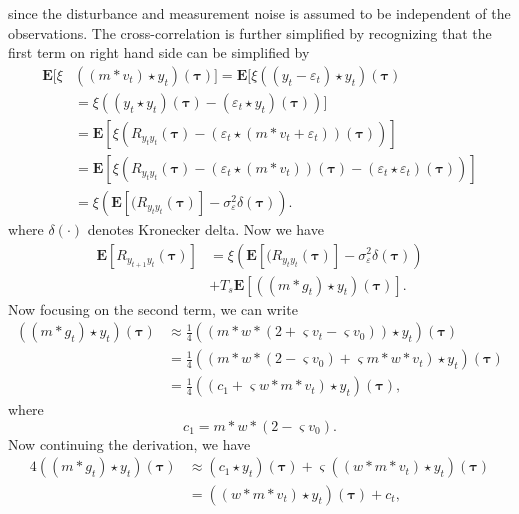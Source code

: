 \documentclass[conference,onecolumn]{IEEEtran}
\begin{document}
since the disturbance and measurement noise is assumed to be independent of the observations. 
The cross-correlation is further simplified by recognizing that the first term on right hand side can be simplified by
\begin{align}
	\mathbf{E}[\xi&\left(\left(m \ast v_t \right) \star y_t \right)(\boldsymbol{\tau})] = \mathbf{E}[\xi\left(\left(y_t-\varepsilon_t\right) \star y_t \right)(\boldsymbol{\tau}) \\
	&= \xi ((y_t \star y_t)(\boldsymbol{\tau}) - \left(\varepsilon_t\star y_t \right)(\boldsymbol{\tau}))] \\
	&= \mathbf{E}[\xi (R_{y_ty_t}(\boldsymbol{\tau})  - \left(\varepsilon_t \star (m\ast v_t + \varepsilon_t)\right) (\boldsymbol{\tau}))] \\
	&=\mathbf{E}[\xi (R_{y_ty_t}(\boldsymbol{\tau})  -\left(\varepsilon_t\star (m\ast v_t)\right)(\boldsymbol{\tau}) - (\varepsilon_t\star\varepsilon_t)(\boldsymbol{\tau}))] \\
	&= \xi\left(\mathbf{E}[ (R_{y_ty_t}(\boldsymbol{\tau})] - \sigma_{\varepsilon}^2 \delta(\boldsymbol{\tau})\right).
\end{align}
where $\delta\left(\cdot\right)$ denotes Kronecker delta. Now we have
\begin{align}
	\mathbf{E}[R_{y_{t+1}y_t}(\boldsymbol{\tau})] &= \xi\left(\mathbf{E}[ (R_{y_ty_t}(\boldsymbol{\tau})] - \sigma_{\varepsilon}^2 \delta(\boldsymbol{\tau})\right) \nonumber \\
	&+ T_s\mathbf{E}[ \left(\left(m\ast g_t\right)\star y_t \right)(\boldsymbol{\tau})].
\end{align}
Now focusing on the second term, we can write
\begin{align}
	((m \ast g_t) \star y_t)(\boldsymbol\tau) &\approx \frac{1}{4}((m \ast w \ast (2 + \varsigma v_t - \varsigma v_0))\star y_t)(\boldsymbol\tau) \\
	&= \frac{1}{4}((m\ast w \ast (2 -\varsigma v_0) + \varsigma m\ast w\ast v_t) \star y_t)(\boldsymbol\tau) \\
&= \frac{1}{4}((c_1 + \varsigma w \ast m\ast v_t) \star y_t)(\boldsymbol\tau),
\end{align}
where
\begin{equation}
	c_1 = m\ast w\ast (2 - \varsigma v_0).
\end{equation}
Now continuing the derivation, we have
\begin{align}
4((m \ast g_t) \star y_t)(\boldsymbol\tau) &\approx (c_1 \star y_t)(\boldsymbol\tau) + \varsigma ((w \ast m\ast v_t) \star y_t)(\boldsymbol\tau) \\
&= (( w \ast m\ast v_t ) \star y_t)(\boldsymbol\tau) + c_t,
\end{align}
\end{document}
